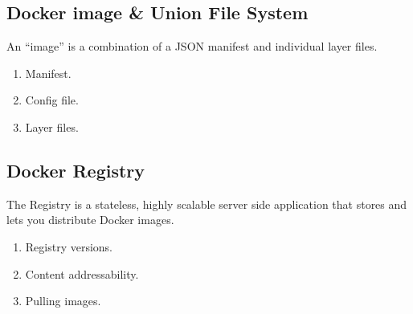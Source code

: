 \subsection{Docker image \& Union File System}

An “image” is a combination of a JSON manifest and individual layer files. 

\begin{enumerate}
	\item Manifest.
	\item Config file.
	\item Layer files.
\end{enumerate}







\subsection{Docker Registry}

The Registry is a stateless, highly scalable server side application that stores and lets you distribute Docker images.

\begin{enumerate}
	\item Registry versions.
	\item Content addressability.
	\item Pulling images.
\end{enumerate}

